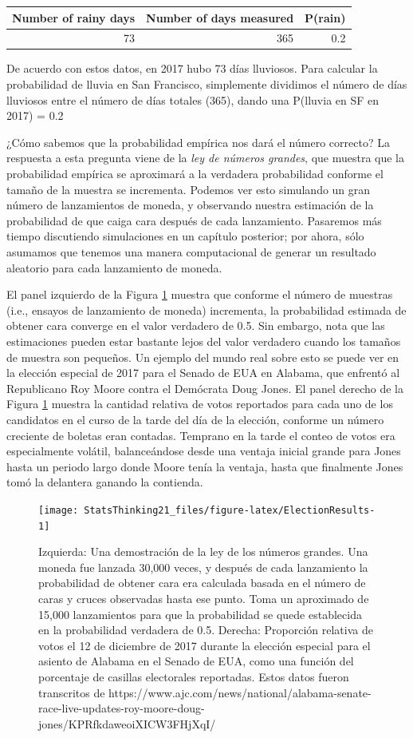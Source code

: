 \documentclass[
  12pt,
]{book}
\theoremstyle{definition}
\theoremstyle{definition}
\theoremstyle{definition}
\theoremstyle{remark}
\begin{document}
\begin{tabular}{r|r|r}
\hline
Number of rainy days & Number of days measured & P(rain)\\
\hline
73 & 365 & 0.2\\
\hline
\end{tabular}

De acuerdo con estos datos, en 2017 hubo 73 días lluviosos. Para calcular la probabilidad de lluvia en San Francisco, simplemente dividimos el número de días lluviosos entre el número de días totales (365), dando una P(lluvia en SF en 2017) = 0.2

¿Cómo sabemos que la probabilidad empírica nos dará el número correcto? La respuesta a esta pregunta viene de la \emph{ley de números grandes}, que muestra que la probabilidad empírica se aproximará a la verdadera probabilidad conforme el tamaño de la muestra se incrementa. Podemos ver esto simulando un gran número de lanzamientos de moneda, y observando nuestra estimación de la probabilidad de que caiga cara después de cada lanzamiento. Pasaremos más tiempo discutiendo simulaciones en un capítulo posterior; por ahora, sólo asumamos que tenemos una manera computacional de generar un resultado aleatorio para cada lanzamiento de moneda.

El panel izquierdo de la Figura \ref{fig:ElectionResults} muestra que conforme el número de muestras (i.e., ensayos de lanzamiento de moneda) incrementa, la probabilidad estimada de obtener cara converge en el valor verdadero de 0.5. Sin embargo, nota que las estimaciones pueden estar bastante lejos del valor verdadero cuando los tamaños de muestra son pequeños. Un ejemplo del mundo real sobre esto se puede ver en la elección especial de 2017 para el Senado de EUA en Alabama, que enfrentó al Republicano Roy Moore contra el Demócrata Doug Jones. El panel derecho de la Figura \ref{fig:ElectionResults} muestra la cantidad relativa de votos reportados para cada uno de los candidatos en el curso de la tarde del día de la elección, conforme un número creciente de boletas eran contadas. Temprano en la tarde el conteo de votos era especialmente volátil, balanceándose desde una ventaja inicial grande para Jones hasta un periodo largo donde Moore tenía la ventaja, hasta que finalmente Jones tomó la delantera ganando la contienda.

\begin{figure}
\texttt{[image: StatsThinking21\_files/figure-latex/ElectionResults-1]} \caption{Izquierda: Una demostración de la ley de los números grandes. Una moneda fue lanzada 30,000 veces, y después de cada lanzamiento la probabilidad de obtener cara era calculada basada en el número de caras y cruces observadas hasta ese punto. Toma un aproximado de 15,000 lanzamientos para que la probabilidad se quede establecida en la probabilidad verdadera de 0.5. Derecha: Proporción relativa de votos el 12 de diciembre de 2017 durante la elección especial para el asiento de Alabama en el Senado de EUA, como una función del porcentaje de casillas electorales reportadas. Estos datos fueron transcritos de https://www.ajc.com/news/national/alabama-senate-race-live-updates-roy-moore-doug-jones/KPRfkdaweoiXICW3FHjXqI/ }\label{fig:ElectionResults}
\end{figure}
\end{document}
